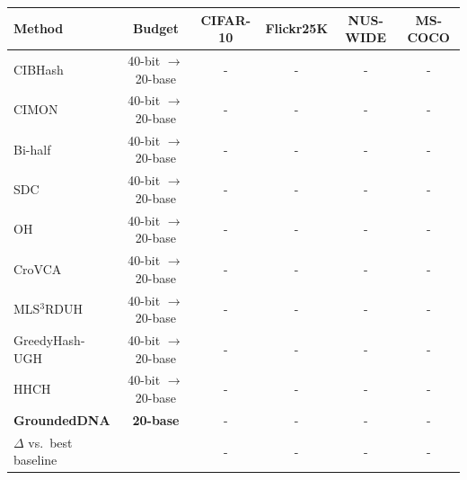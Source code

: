 \begin{tabular}{lccccc}
\toprule
Method & Budget & CIFAR-10 & Flickr25K & NUS-WIDE & MS-COCO \\
\midrule
CIBHash        & 40-bit $\rightarrow$ 20-base & - & - & - & - \\
CIMON          & 40-bit $\rightarrow$ 20-base & - & - & - & - \\
Bi-half        & 40-bit $\rightarrow$ 20-base & - & - & - & - \\
SDC            & 40-bit $\rightarrow$ 20-base & - & - & - & - \\
OH             & 40-bit $\rightarrow$ 20-base & - & - & - & - \\
CroVCA         & 40-bit $\rightarrow$ 20-base & - & - & - & - \\
MLS$^3$RDUH    & 40-bit $\rightarrow$ 20-base & - & - & - & - \\
GreedyHash-UGH & 40-bit $\rightarrow$ 20-base & - & - & - & - \\
HHCH           & 40-bit $\rightarrow$ 20-base & - & - & - & - \\
\midrule
\textbf{GroundedDNA} & \textbf{20-base} & - & - & - & - \\
$\Delta$ vs.\ best baseline & & - & - & - & - \\
\bottomrule
\end{tabular}
